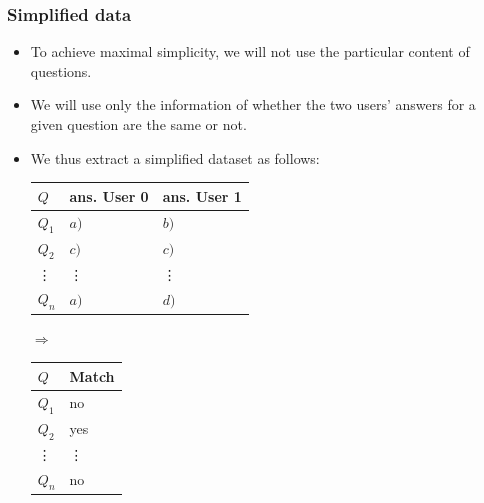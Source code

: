 \documentclass{beamer}
\begin{document}
\begin{frame}
  \frametitle{Simplified data}
  \begin{itemize}
  \item To achieve maximal simplicity, we will not use the particular content of questions.
  \item We will use only the information of whether the two users' answers for a given question are the same or not.
  \item We thus extract a simplified dataset as follows:\\
    \begin{minipage}{0.48\linewidth}
      \begin{tabular}{|l|l|l|}
        \hline
        $Q$ & ans. User 0 & ans. User 1\\
        \hline
        $Q_1$ & $a)$ & $b)$\\
        $Q_2$ & $c)$ & $c)$\\
        \vdots & \vdots & \vdots\\
      $Q_n$ & $a)$ & $d)$\\
        \hline
      \end{tabular}
    \end{minipage}
    \begin{minipage}{0.05\linewidth}
      $\Rightarrow$
    \end{minipage}
    \begin{minipage}{0.2\linewidth}
      \begin{tabular}{|l|l|}
        \hline
        $Q$ & Match\\
        \hline
        $Q_1$ & no\\
        $Q_2$ & yes\\
        \vdots & \vdots\\
        $Q_n$ & no\\
        \hline
      \end{tabular}
    \end{minipage}
  \end{itemize}
\end{frame}
\end{document}
